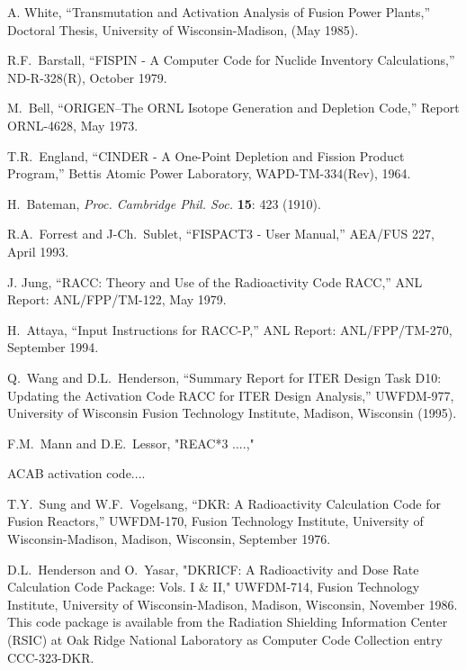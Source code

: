 
\begin{thebibliography}{100}

 A. White, ``Transmutation and Activation
  Analysis of Fusion Power Plants,'' Doctoral Thesis, University of
  Wisconsin-Madison, (May 1985).
  
 R.F.~Barstall, ``FISPIN - A Computer Code for
  Nuclide Inventory Calculations,'' ND-R-328(R), October 1979.

 M.~Bell, ``ORIGEN--The ORNL Isotope Generation
  and Depletion Code,'' Report ORNL-4628, May 1973.
  
 T.R.~England, ``CINDER - A One-Point Depletion and
  Fission Product Program,'' Bettis Atomic Power Laboratory,
  WAPD-TM-334(Rev), 1964.
  
 H.~Bateman, \textsl{Proc. Cambridge Phil. Soc.}
  \textbf{15}: 423 (1910).
  
 R.A.~Forrest and J-Ch.~Sublet, ``FISPACT3 - User
  Manual,'' AEA/FUS 227, April 1993.
  
 J. Jung, ``RACC: Theory and Use of the
  Radioactivity Code RACC,'' ANL Report: ANL/FPP/TM-122, May 1979.
  
 H.~Attaya, ``Input Instructions for RACC-P,'' ANL
  Report: ANL/FPP/TM-270, September 1994.
  
 Q.~Wang and D.L.~Henderson, ``Summary Report for ITER
  Design Task D10: Updating the Activation Code RACC for ITER Design
  Analysis,'' UWFDM-977, University of Wisconsin Fusion Technology
  Institute, Madison, Wisconsin (1995).

F.M.~Mann and D.E.~Lessor, "REAC*3 ....," 

 ACAB activation code....

T.Y.~Sung and W.F.~Vogelsang, ``DKR: A Radioactivity
  Calculation Code for Fusion Reactors,'' UWFDM-170, Fusion Technology
  Institute, University of Wisconsin-Madison, Madison, Wisconsin,
  September 1976.
  
D.L.~Henderson and O.~Yasar, "DKRICF: A Radioactivity
  and Dose Rate Calculation Code Package: Vols. I \& II," UWFDM-714,
  Fusion Technology Institute, University of Wisconsin-Madison,
  Madison, Wisconsin, November 1986.  This code package is available
  from the Radiation Shielding Information Center (RSIC) at Oak Ridge
  National Laboratory as Computer Code Collection entry CCC-323-DKR.
  

\end{thebibliography}
